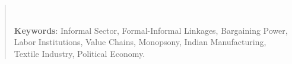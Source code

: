 \documentclass[12pt,a4paper]{report}
\begin{document}
	
	\setcounter{page}{1}
	
	
	
	
	\tableofcontents
	\listoftables
	\listoffigures
	
	\cleardoublepage
	\setcounter{page}{1}
	
	\begin{abstract}
		\\
		\vspace{0.5 cm}
		
		\noindent \textbf{Keywords}: Informal Sector, Formal-Informal Linkages, Bargaining Power, Labor Institutions, Value Chains, Monopsony, Indian Manufacturing, Textile Industry, Political Economy.
	\end{abstract}
	
	
	
	
	
	  
	
	
	
	
    \printbibliography
    
    
	\appendix
	
	
	
	
	

    
	
\end{document}
